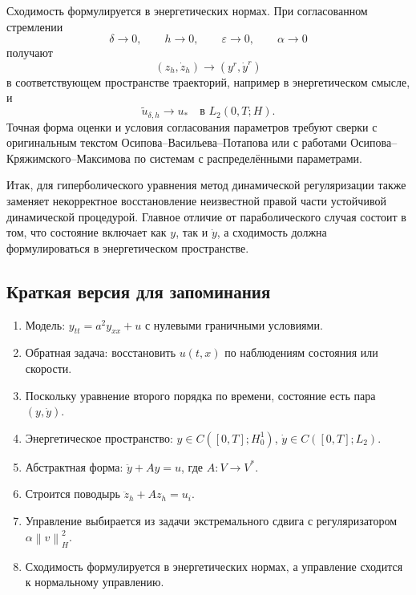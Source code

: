 \documentclass[12pt,a4paper]{article}
\newcommand{\norm}[1]{\left\lVert #1\right\rVert}
\begin{document}
Сходимость формулируется в энергетических нормах. При согласованном стремлении
\[
    \delta\to0,
    \qquad h\to0,
    \qquad \varepsilon\to0,
    \qquad \alpha\to0
\]
получают
\begin{equation}
    (z_h,\dot z_h)\to (y^r,\dot y^r)
\end{equation}
в соответствующем пространстве траекторий, например в энергетическом смысле, и
\begin{equation}
    \tilde u_{\delta,h}\to u_* \quad\text{в } L_2(0,T;H).
\end{equation}
Точная форма оценки и условия согласования параметров требуют сверки с оригинальным текстом Осипова--Васильева--Потапова или с работами Осипова--Кряжимского--Максимова по системам с распределёнными параметрами.

Итак, для гиперболического уравнения метод динамической регуляризации также заменяет некорректное восстановление неизвестной правой части устойчивой динамической процедурой. Главное отличие от параболического случая состоит в том, что состояние включает как $y$, так и $\dot y$, а сходимость должна формулироваться в энергетическом пространстве.

\subsection*{Краткая версия для запоминания}

\begin{enumerate}
    \item Модель: $y_{tt}=a^2y_{xx}+u$ с нулевыми граничными условиями.
    \item Обратная задача: восстановить $u(t,x)$ по наблюдениям состояния или скорости.
    \item Поскольку уравнение второго порядка по времени, состояние есть пара $(y,\dot y)$.
    \item Энергетическое пространство: $y\in C([0,T];H_0^1)$, $\dot y\in C([0,T];L_2)$.
    \item Абстрактная форма: $\ddot y+Ay=u$, где $A:V\to V^*$.
    \item Строится поводырь $\ddot z_h+Az_h=u_i$.
    \item Управление выбирается из задачи экстремального сдвига с регуляризатором $\alpha\norm{v}_H^2$.
    \item Сходимость формулируется в энергетических нормах, а управление сходится к нормальному управлению.
\end{enumerate}
\end{document}
